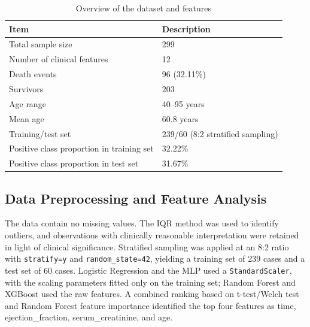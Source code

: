 \documentclass[a4paper,12pt]{article}
\begin{document}
\begin{table}[H]\centering
\caption{Overview of the dataset and features}
\begin{tabular}{ll}\toprule
Item&Description\\\midrule
Total sample size&299\\
Number of clinical features&12\\
Death events&96 (32.11\%)\\
Survivors&203\\
Age range&40--95 years\\
Mean age&60.8 years\\
Training/test set&239/60 (8:2 stratified sampling)\\
Positive class proportion in training set&32.22\%\\
Positive class proportion in test set&31.67\%\\\bottomrule
\end{tabular}\end{table}

\subsection{Data Preprocessing and Feature Analysis}
The data contain no missing values. The IQR method was used to identify outliers, and observations with clinically reasonable interpretation were retained in light of clinical significance. Stratified sampling was applied at an 8:2 ratio with \texttt{stratify=y} and \texttt{random\_state=42}, yielding a training set of 239 cases and a test set of 60 cases. Logistic Regression and the MLP used a \texttt{StandardScaler}, with the scaling parameters fitted only on the training set; Random Forest and XGBoost used the raw features. A combined ranking based on t-test/Welch test and Random Forest feature importance identified the top four features as time, ejection\_fraction, serum\_creatinine, and age.
\end{document}

